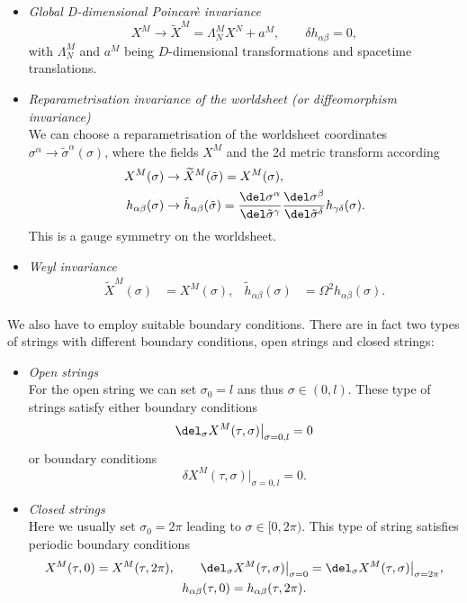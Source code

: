 \begin{itemize}
\item\textit{Global D-dimensional Poincarè invariance}
%
\begin{equation}
X^{M} \rightarrow \widetilde{X}^{M} = \Lambda_{N}^{M} X^{N} + a^{M}, \qquad \delta	h_{\alpha\beta} = 0,
\end{equation}
%
with $\Lambda_{N}^{M}$ and $a^{M}$ being $D$-dimensional  transformations and spacetime translations.
%
%
\item\textit{Reparametrisation invariance of the worldsheet (or diffeomorphism invariance)}\\[2mm]
We can choose a reparametrisation of the worldsheet coordinates $\sigma^{\alpha}\rightarrow \tilde{\sigma}^{\alpha}(\sigma)$, where the fields $X^{M}$ and the 2d metric transform according
%
\begin{equation}
\begin{alignedat}{3}
X^{M}(\sigma) &\rightarrow \widetilde{X}^{M}(\tilde{\sigma}) = X^{M}(\sigma), \\
h_{\alpha\beta}(\sigma) &\rightarrow \tilde{h}_{\alpha\beta}(\tilde{\sigma}) = \frac{\del \sigma^{\alpha}}{\del \tilde{\sigma}^{\gamma}} \frac{\del \sigma^{\beta}}{\del \tilde{\sigma}^{\delta}}h_{\gamma\delta}(\sigma).
\end{alignedat}
\end{equation}
%
This is a gauge symmetry on the worldsheet.
%
%
\item\textit{Weyl invariance}
\begin{align}
\widetilde{X}^{M}(\sigma) &= X^{M}(\sigma), &  \tilde{h}_{\alpha\beta}(\sigma)&=\Omega^{2}h_{\alpha\beta}(\sigma).
\end{align}
\end{itemize}
%
%
We also have to employ suitable boundary conditions. There are in fact two types of strings with different boundary conditions, open strings and closed strings:
%
%
\begin{itemize}
\item \textit{Open strings}\\[2mm]
For the open string we can set $\sigma_{0}=l$ ans thus $\sigma\in (0,l)$. These type of strings satisfy either   boundary conditions
%
\begin{equation}
\del_{\sigma}X^{M}(\tau,\sigma)\big\vert_{\sigma=0,l} = 0
\end{equation}
%
or  boundary conditions
%
\begin{equation}
\delta X^{M}(\tau,\sigma)\big\vert_{\sigma=0,l}=0.
\end{equation}
%
%
\item \textit{Closed strings}\\[2mm]
Here we usually set $\sigma_{0}=2\pi$ leading to $\sigma\in [0,2\pi)$. This type of string satisfies periodic boundary conditions
%
\begin{gather}
X^{M}(\tau,0)=X^{M}(\tau,2\pi), \qquad \del_{\sigma}X^{M}(\tau	,\sigma)\big\vert_{\sigma=0} = \del_{\sigma}X^{M}(\tau	,\sigma)\big\vert_{\sigma=2\pi}, \notag\\ h_{\alpha\beta}(\tau,0)=h_{\alpha\beta}(\tau,2\pi).
\end{gather}
\end{itemize}
